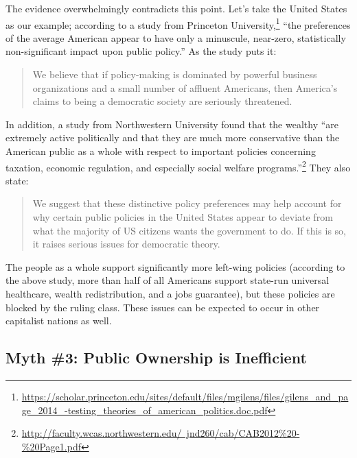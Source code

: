 The evidence overwhelmingly contradicts this point.
Let's take the United States as our example; according to a study from Princeton University,\footnote{\href{https://scholar.princeton.edu/sites/default/files/mgilens/files/gilens_and_page_2014_-testing_theories_of_american_politics.doc.pdf}{https://scholar.princeton.edu/sites/default/files/mgilens/files/gilens\_and\_page\_2014\_-testing\_theories\_of\_american\_politics.doc.pdf}} ``the preferences of the average American appear to have only a minuscule, near-zero, statistically non-significant impact upon public policy.''
As the study puts it:
\begin{quote}
We believe that if policy-making is dominated by powerful business organizations and a small number of affluent Americans, then America’s claims to being a democratic society are seriously threatened.
\end{quote}
In addition, a study from Northwestern University found that the wealthy ``are extremely active politically and that they are much more conservative than the American public as a whole with respect to important policies concerning taxation, economic regulation, and especially social welfare programs.''\footnote{\href{http://faculty.wcas.northwestern.edu/~jnd260/cab/CAB2012\%20-\%20Page1.pdf}{http://faculty.wcas.northwestern.edu/~jnd260/cab/CAB2012\%20-\%20Page1.pdf}}
They also state:
\begin{quote}
We suggest that these distinctive policy preferences may help account for why certain public policies in the United States appear to deviate from what the majority of US citizens wants the government to do.
If this is so, it raises serious issues for democratic theory.
\end{quote}
The people as a whole support significantly more left-wing policies (according to the above study, more than half of all Americans support state-run universal healthcare, wealth redistribution, and a jobs guarantee), but these policies are blocked by the ruling class.
These issues can be expected to occur in other capitalist nations as well.

\subsection*{Myth \#3: Public Ownership is Inefficient}

